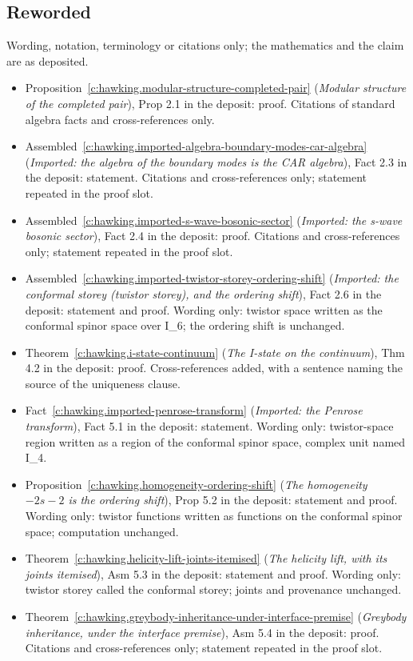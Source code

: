 \documentclass[11pt]{article}
\theoremstyle{definition}
\theoremstyle{plain}
\begin{document}
\subsection*{Reworded}
Wording, notation, terminology or citations only; the mathematics and the claim are as deposited.
\begin{itemize}\setlength{\itemsep}{2pt}
\item Proposition~\ref{c:hawking.modular-structure-completed-pair} (\emph{Modular structure of the completed pair}), Prop 2.1 in the deposit: proof. Citations of standard algebra facts and cross-references only.
\item Assembled~\ref{c:hawking.imported-algebra-boundary-modes-car-algebra} (\emph{Imported: the algebra of the boundary modes is the CAR algebra}), Fact 2.3 in the deposit: statement. Citations and cross-references only; statement repeated in the proof slot.
\item Assembled~\ref{c:hawking.imported-s-wave-bosonic-sector} (\emph{Imported: the s-wave bosonic sector}), Fact 2.4 in the deposit: proof. Citations and cross-references only; statement repeated in the proof slot.
\item Assembled~\ref{c:hawking.imported-twistor-storey-ordering-shift} (\emph{Imported: the conformal storey (twistor storey), and the ordering shift}), Fact 2.6 in the deposit: statement and proof. Wording only: twistor space written as the conformal spinor space over I\_6; the ordering shift is unchanged.
\item Theorem~\ref{c:hawking.i-state-continuum} (\emph{The I-state on the continuum}), Thm 4.2 in the deposit: proof. Cross-references added, with a sentence naming the source of the uniqueness clause.
\item Fact~\ref{c:hawking.imported-penrose-transform} (\emph{Imported: the Penrose transform}), Fact 5.1 in the deposit: statement. Wording only: twistor-space region written as a region of the conformal spinor space, complex unit named I\_4.
\item Proposition~\ref{c:hawking.homogeneity-ordering-shift} (\emph{The homogeneity $-2s-2$ is the ordering shift}), Prop 5.2 in the deposit: statement and proof. Wording only: twistor functions written as functions on the conformal spinor space; computation unchanged.
\item Theorem~\ref{c:hawking.helicity-lift-joints-itemised} (\emph{The helicity lift, with its joints itemised}), Asm 5.3 in the deposit: statement and proof. Wording only: twistor storey called the conformal storey; joints and provenance unchanged.
\item Theorem~\ref{c:hawking.greybody-inheritance-under-interface-premise} (\emph{Greybody inheritance, under the interface premise}), Asm 5.4 in the deposit: proof. Citations and cross-references only; statement repeated in the proof slot.
\end{itemize}
\end{document}
